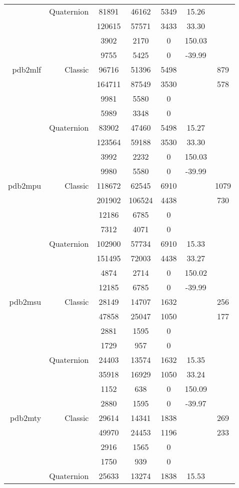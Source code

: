 \begin{xltabular}{\textwidth}{r|rcccSc}
& Quaternion & 81891 & 46162 & 5349 & 15.26 & \\
& & 120615 & 57571 & 3433 & 33.30 & \\
& & 3902 & 2170 & 0 & 150.03 & \\
& & 9755 & 5425 & 0 & -39.99 & \\ \addlinespace
pdb2mlf & Classic & 96716 & 51396 & 5498 & & 879 \\
& & 164711 & 87549 & 3530 & & 578 \\
& & 9981 & 5580 & 0 & & \\
& & 5989 & 3348 & 0 & & \\
& Quaternion & 83902 & 47460 & 5498 & 15.27 & \\
& & 123564 & 59188 & 3530 & 33.30 & \\
& & 3992 & 2232 & 0 & 150.03 & \\
& & 9980 & 5580 & 0 & -39.99 & \\ \addlinespace
pdb2mpu & Classic & 118672 & 62545 & 6910 & & 1079 \\
& & 201902 & 106524 & 4438 & & 730 \\
& & 12186 & 6785 & 0 & & \\
& & 7312 & 4071 & 0 & & \\
& Quaternion & 102900 & 57734 & 6910 & 15.33 & \\
& & 151495 & 72003 & 4438 & 33.27 & \\
& & 4874 & 2714 & 0 & 150.02 & \\
& & 12185 & 6785 & 0 & -39.99 & \\ \addlinespace
pdb2msu & Classic & 28149 & 14707 & 1632 & & 256 \\
& & 47858 & 25047 & 1050 & & 177 \\
& & 2881 & 1595 & 0 & & \\
& & 1729 & 957 & 0 & & \\
& Quaternion & 24403 & 13574 & 1632 & 15.35 & \\
& & 35918 & 16929 & 1050 & 33.24 & \\
& & 1152 & 638 & 0 & 150.09 & \\
& & 2880 & 1595 & 0 & -39.97 & \\ \addlinespace
pdb2mty & Classic & 29614 & 14341 & 1838 & & 269 \\
& & 49970 & 24453 & 1196 & & 233 \\
& & 2916 & 1565 & 0 & & \\
& & 1750 & 939 & 0 & & \\
& Quaternion & 25633 & 13274 & 1838 & 15.53 & \\

\end{xltabular}
